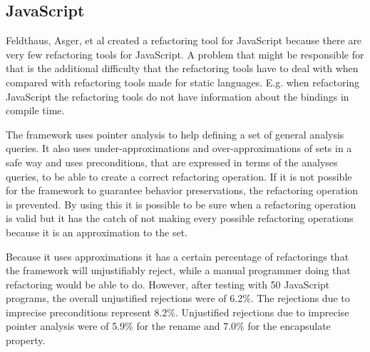 \subsection{JavaScript}

Feldthaus, Asger, et al \cite{feldthaus2011tool} created a refactoring tool for JavaScript because there are very few refactoring tools for JavaScript. 
A problem that might be responsible for that is the additional difficulty that the refactoring tools have to deal with when compared with refactoring tools made for static languages. 
E.g. when refactoring JavaScript the refactoring tools do not have information about the bindings in compile time.



The framework uses pointer analysis to help defining a set of general analysis queries. 
It also uses under-approximations and over-approximations of sets in a safe way and uses preconditions, that are expressed in terms of the analyses queries, to be able to create a correct refactoring operation. 
If it is not possible for the framework to guarantee behavior preservations, the refactoring operation is prevented.
By using this it is possible to be sure when a refactoring operation is valid but it has the catch of not making every possible refactoring operations because it is an approximation to the set.



Because it uses approximations it has a certain percentage of refactorings that the framework will unjustifiably reject, while a manual programmer doing that refactoring would be able to do. 
However, after testing with 50 JavaScript programs, the overall unjustified rejections were of 6.2\%. 
The rejections due to imprecise preconditions represent 8.2\%.
Unjustified rejections due to imprecise pointer analysis were of 5.9\% for the rename and 7.0\% for the encapsulate property. 
